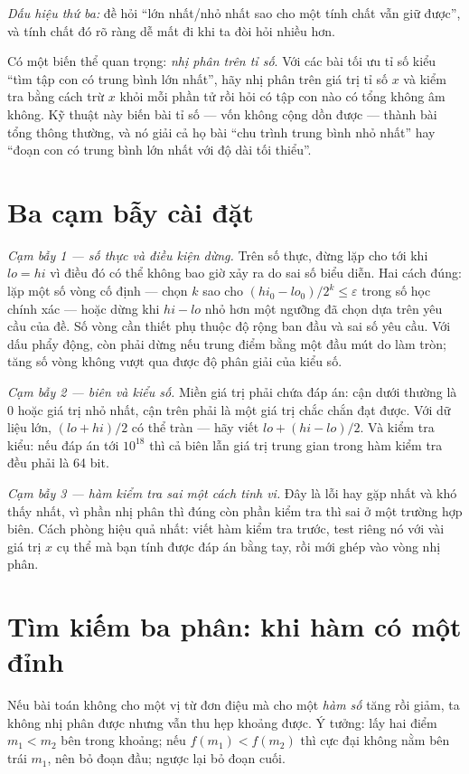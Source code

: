 \documentclass[../../algorithm.tex]{subfiles}
\begin{document}
\emph{Dấu hiệu thứ ba:} đề hỏi ``lớn nhất/nhỏ nhất sao cho một tính chất vẫn giữ được'', và tính chất đó rõ ràng dễ mất đi khi ta đòi hỏi nhiều hơn.

Có một biến thể quan trọng: \emph{nhị phân trên tỉ số}. Với các bài tối ưu tỉ số kiểu ``tìm tập con có trung bình lớn nhất'', hãy nhị phân trên giá trị tỉ số \(x\) và kiểm tra bằng cách trừ \(x\) khỏi mỗi phần tử rồi hỏi có tập con nào có tổng không âm không. Kỹ thuật này biến bài tỉ số --- vốn không cộng dồn được --- thành bài tổng thông thường, và nó giải cả họ bài ``chu trình trung bình nhỏ nhất'' hay ``đoạn con có trung bình lớn nhất với độ dài tối thiểu''.

\section{Ba cạm bẫy cài đặt}

\emph{Cạm bẫy 1 --- số thực và điều kiện dừng.} Trên số thực, đừng lặp cho tới khi \(lo = hi\) vì điều đó có thể không bao giờ xảy ra do sai số biểu diễn. Hai cách đúng: lặp một số vòng cố định --- chọn \(k\) sao cho \((hi_0-lo_0)/2^k\le\varepsilon\) trong số học chính xác --- hoặc dừng khi \(hi - lo\) nhỏ hơn một ngưỡng đã chọn dựa trên yêu cầu của đề. Số vòng cần thiết phụ thuộc độ rộng ban đầu và sai số yêu cầu. Với dấu phẩy động, còn phải dừng nếu trung điểm bằng một đầu mút do làm tròn; tăng số vòng không vượt qua được độ phân giải của kiểu số.

\emph{Cạm bẫy 2 --- biên và kiểu số.} Miền giá trị phải chứa đáp án: cận dưới thường là 0 hoặc giá trị nhỏ nhất, cận trên phải là một giá trị chắc chắn đạt được. Với dữ liệu lớn, \((lo+hi)/2\) có thể tràn --- hãy viết \(lo + (hi-lo)/2\). Và kiểm tra kiểu: nếu đáp án tới \(10^{18}\) thì cả biên lẫn giá trị trung gian trong hàm kiểm tra đều phải là 64 bit.

\emph{Cạm bẫy 3 --- hàm kiểm tra sai một cách tinh vi.} Đây là lỗi hay gặp nhất và khó thấy nhất, vì phần nhị phân thì đúng còn phần kiểm tra thì sai ở một trường hợp biên. Cách phòng hiệu quả nhất: viết hàm kiểm tra trước, test riêng nó với vài giá trị \(x\) cụ thể mà bạn tính được đáp án bằng tay, rồi mới ghép vào vòng nhị phân.

\section{Tìm kiếm ba phân: khi hàm có một đỉnh}

Nếu bài toán không cho một vị từ đơn điệu mà cho một \emph{hàm số} tăng rồi giảm, ta không nhị phân được nhưng vẫn thu hẹp khoảng được. Ý tưởng: lấy hai điểm \(m_1 < m_2\) bên trong khoảng; nếu \(f(m_1) < f(m_2)\) thì cực đại không nằm bên trái \(m_1\), nên bỏ đoạn đầu; ngược lại bỏ đoạn cuối.
\end{document}
